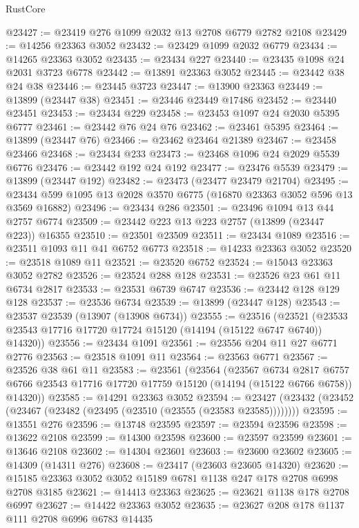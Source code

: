 \begin{lexlean}{RustCore}
\begin{coremodule}
@23427 := @23419 @276 @1099 @2032 @13 @2708 @6779 @2782 @2108
@23429 := @14256 @23363 @3052
@23432 := @23429 @1099 @2032 @6779
@23434 := @14265 @23363 @3052
@23435 := @23434 @227
@23440 := @23435 @1098 @24 @2031 @3723 @6778
@23442 := @13891 @23363 @3052
@23445 := @23442 @38 @24 @38
@23446 := @23445 @3723
@23447 := @13900 @23363
@23449 := @13899 (@23447 @38)
@23451 := @23446 @23449 @17486
@23452 := @23440 @23451
@23453 := @23434 @229
@23458 := @23453 @1097 @24 @2030 @5395 @6777
@23461 := @23442 @76 @24 @76
@23462 := @23461 @5395
@23464 := @13899 (@23447 @76)
@23466 := @23462 @23464 @21389
@23467 := @23458 @23466
@23468 := @23434 @233
@23473 := @23468 @1096 @24 @2029 @5539 @6776
@23476 := @23442 @192 @24 @192
@23477 := @23476 @5539
@23479 := @13899 (@23447 @192)
@23482 := @23473 (@23477 @23479 @21704)
@23495 := @23434 @599 @1095 @13 @2028 @3570 @6775 (@16870 @23363 @3052 @596 @13 @3569 @16882)
@23496 := @23434 @286
@23501 := @23496 @1094 @13 @44 @2757 @6774
@23509 := @23442 @223 @13 @223 @2757 (@13899 (@23447 @223)) @16355
@23510 := @23501 @23509
@23511 := @23434 @1089
@23516 := @23511 @1093 @11 @41 @6752 @6773
@23518 := @14233 @23363 @3052
@23520 := @23518 @1089 @11
@23521 := @23520 @6752
@23524 := @15043 @23363 @3052 @2782
@23526 := @23524 @288 @128
@23531 := @23526 @23 @61 @11 @6734 @2817
@23533 := @23531 @6739 @6747
@23536 := @23442 @128 @129 @128
@23537 := @23536 @6734
@23539 := @13899 (@23447 @128)
@23543 := @23537 @23539 (@13907 (@13908 @6734))
@23555 := @23516
    (@23521 (@23533 @23543 @17716 @17720 @17724 @15120 (@14194 (@15122 @6747 @6740)) @14320))
@23556 := @23434 @1091
@23561 := @23556 @204 @11 @27 @6771 @2776
@23563 := @23518 @1091 @11
@23564 := @23563 @6771
@23567 := @23526 @38 @61 @11
@23583 := @23561
    (@23564
      (@23567
        @6734
        @2817
        @6757
        @6766
        @23543
        @17716
        @17720
        @17759
        @15120
        (@14194 (@15122 @6766 @6758))
        @14320))
@23585 := @14291 @23363 @3052
@23594 := @23427 (@23432 (@23452 (@23467 (@23482 (@23495 (@23510 (@23555 (@23583 @23585))))))))
@23595 := @13551 @276
@23596 := @13748 @23595
@23597 := @23594 @23596
@23598 := @13622 @2108
@23599 := @14300 @23598
@23600 := @23597 @23599
@23601 := @13646 @2108
@23602 := @14304 @23601
@23603 := @23600 @23602
@23605 := @14309 (@14311 @276)
@23608 := @23417 (@23603 @23605 @14320)
@23620 := @15185 @23363 @3052 @3052 @15189 @6781 @1138 @247 @178 @2708 @6998 @2708 @3185
@23621 := @14413 @23363
@23625 := @23621 @1138 @178 @2708 @6997
@23627 := @14422 @23363 @3052
@23635 := @23627 @208 @178 @1137 @111 @2708 @6996 @6783 @14435

\end{coremodule}
\end{lexlean}
